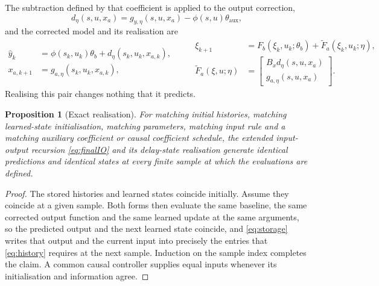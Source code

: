 \documentclass[11pt,a4paper]{article}
\newtheorem{proposition}{Proposition}
\theoremstyle{remark}
\begin{document}
The subtraction defined by that coefficient is applied to the output correction,
\begin{equation*}
d_\eta(s,u,x_a)=g_{y,\eta}(s,u,x_a)-\phi(s,u)\theta_{\mathrm{aux}},
\end{equation*}
and the corrected model and its realisation are
\begin{equation}\label{eq:finalIO}
\boxed{\begin{aligned}
\hat y_k&=\phi(s_k,u_k)\theta_b+d_\eta(s_k,u_k,x_{a,k}),\\
x_{a,k+1}&=g_{a,\eta}(s_k,u_k,x_{a,k}),
\end{aligned}}
\qquad
\boxed{\begin{aligned}
\xi_{k+1}&=F_b(\xi_k,u_k;\theta_b)+\widetilde F_a(\xi_k,u_k;\eta),\\
\widetilde F_a(\xi,u;\eta)&=\begin{bmatrix}B_xd_\eta(s,u,x_a)\\
g_{a,\eta}(s,u,x_a)\end{bmatrix}.
\end{aligned}}
\end{equation}
Realising this pair changes nothing that it predicts.

\begin{proposition}[Exact realisation]\label{prop:equivalence}
For matching initial histories, matching learned-state initialisation, matching parameters,
matching input rule and a matching auxiliary coefficient or causal coefficient schedule, the
extended input-output recursion \eqref{eq:finalIO} and its delay-state realisation generate
identical predictions and identical states at every finite sample at which the evaluations are
defined.
\end{proposition}

\begin{proof}
The stored histories and learned states coincide initially. Assume they coincide at a given
sample. Both forms then evaluate the same baseline, the same corrected output function and the
same learned update at the same arguments, so the predicted output and the next learned state
coincide, and \eqref{eq:storage} writes that output and the current input into precisely the
entries that \eqref{eq:history} requires at the next sample. Induction on the sample index
completes the claim. A common causal controller supplies equal inputs whenever its initialisation
and information agree.
\end{proof}
\end{document}
